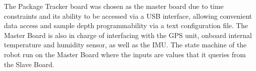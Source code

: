 The Package Tracker board was chosen as the master board due to time constraints and its ability to be accessed via a USB interface, allowing convenient data access and sample depth programmability via a text configuration file. The Master Board is also in charge of interfacing with the GPS unit, onboard internal temperature and humidity sensor, as well as the IMU. The state machine of the robot run on the Master Board where the inputs are values that it queries from the Slave Board. 





